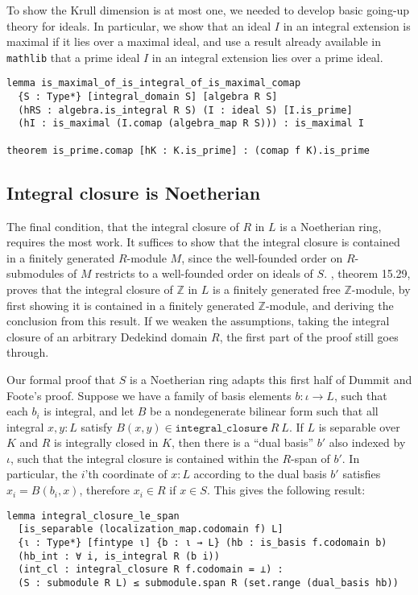 \documentclass[a4paper,USenglish,cleveref, autoref, thm-restate]{lipics-v2021}
\newcommand{\lean}[1]{\texttt{#1}\xspace} %
\newcommand{\mathlib}{\texttt{mathlib}\xspace}
\newcommand{\Z}{\mathbb{Z}}
\begin{document}
To show the Krull dimension is at most one, we needed to develop basic going-up theory for ideals.
In particular, we show that an ideal $I$ in an integral extension is maximal if it lies over a maximal ideal,
and use a result already available in \mathlib that a prime ideal $I$ in an integral extension lies over a prime ideal.
\begin{lstlisting}
lemma is_maximal_of_is_integral_of_is_maximal_comap
  {S : Type*} [integral_domain S] [algebra R S]
  (hRS : algebra.is_integral R S) (I : ideal S) [I.is_prime]
  (hI : is_maximal (I.comap (algebra_map R S))) : is_maximal I

theorem is_prime.comap [hK : K.is_prime] : (comap f K).is_prime
\end{lstlisting}

\subsection{Integral closure is Noetherian}
The final condition, that the integral closure of $R$ in $L$ is a Noetherian ring, requires the most work.
It suffices to show that the integral closure is contained in a finitely generated $R$-module $M$,
since the well-founded order on $R$-submodules of $M$ restricts to a well-founded order on ideals of $S$.
\cite{Dummit-and-Foote}, theorem 15.29, proves that the integral closure of $\Z$ in $L$ is a finitely generated free $\Z$-module,
by first showing it is contained in a finitely generated $\Z$-module, and deriving the conclusion from this result.
If we weaken the assumptions, taking the integral closure of an arbitrary Dedekind domain $R$,
the first part of the proof still goes through.

Our formal proof that $S$ is a Noetherian ring adapts this first half of Dummit and Foote's proof.
Suppose we have a family of basis elements $b : \iota \to L$, such that each $b_i$ is integral,
and let $B$ be a nondegenerate bilinear form such that all integral $x, y : L$ satisfy $B(x, y) \in \lean{integral\_closure}\ R\ L$.
If $L$ is separable over $K$ and $R$ is integrally closed in $K$,
then there is a ``dual basis'' $b'$ also indexed by $\iota$, such that the integral closure is contained within the $R$-span of $b'$.
In particular, the $i$'th coordinate of $x : L$ according to the dual basis $b'$ satisfies $x_i = B(b_i, x)$,
therefore $x_i \in R$ if $x \in S$.
This gives the following result:
\begin{lstlisting}
lemma integral_closure_le_span
  [is_separable (localization_map.codomain f) L]
  {ι : Type*} [fintype ι] {b : ι → L} (hb : is_basis f.codomain b)
  (hb_int : ∀ i, is_integral R (b i))
  (int_cl : integral_closure R f.codomain = ⊥) :
  (S : submodule R L) ≤ submodule.span R (set.range (dual_basis hb))
\end{lstlisting}
\end{document}
